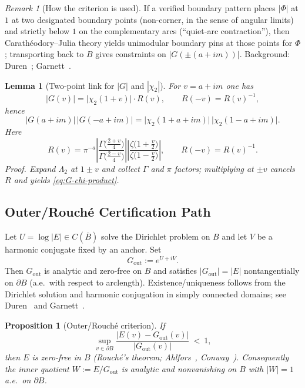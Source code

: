 \documentclass[11pt]{article}
\numberwithin{equation}{section}
\newtheorem{lemma}[theorem]{Lemma}
\newtheorem{proposition}[theorem]{Proposition}
\theoremstyle{remark}
\newtheorem{remark}[theorem]{Remark}
\newcommand{\LamTwo}{\Lambda_2}
\newcommand{\Gout}{G_{\mathrm{out}}}
\begin{document}
\begin{remark}[How the criterion is used]
If a verified boundary pattern places $|\Phi|$ at $1$ at two designated boundary points (non-corner, in the sense of angular limits) and strictly below $1$ on the complementary arcs (``quiet-arc contraction''), then Carath\'eodory--Julia theory yields unimodular boundary pins at those points for $\Phi$; transporting back to $B$ gives constraints on $|G(\pm(a+im))|$. Background: Duren~\cite[Chs.~II, IV--V]{DurenHp}; Garnett~\cite[Chs.~II--III]{GarnettBAF}.
\end{remark}

\begin{lemma}[Two-point link for $|G|$ and $|\chi_2|$]\label{lem:G-chi-link}
For $v=a+im$ one has
\begin{equation}\label{eq:G-chi-link}
|G(v)|=\big|\chi_2(1+v)\big|\cdot R(v),\qquad R(-v)=R(v)^{-1},
\end{equation}
hence
\begin{equation}\label{eq:G-chi-product}
|G(a+im)|\,|G(-a+im)|
=\big|\chi_2(1+a+im)\big|\,\big|\chi_2(1-a+im)\big|.
\end{equation}
Here
\[
R(v)=\pi^{-a}\left|\frac{\Gamma\!\Big(\frac{2+v}{4}\Big)}{\Gamma\!\Big(\frac{2-v}{4}\Big)}\right|
\left|\frac{\zeta\!\big(1+\tfrac{v}{2}\big)}{\zeta\!\big(1-\tfrac{v}{2}\big)}\right|,
\qquad R(-v)=R(v)^{-1}.
\]
\emph{Proof.}
Expand $\LamTwo$ at $1\pm v$ and collect $\Gamma$ and $\pi$ factors; multiplying at $\pm v$ cancels $R$ and yields \eqref{eq:G-chi-product}.
\end{lemma}

\subsection{Outer/Rouch\'e Certification Path}\label{subsec:rouche-criterion}

Let $U=\log|E|\in C(\overline B)$ solve the Dirichlet problem on $B$ and let $V$ be a harmonic conjugate fixed by an anchor. Set
\[
\Gout:=e^{U+iV}.
\]
Then $\Gout$ is analytic and zero-free on $B$ and satisfies $|\Gout|=|E|$ nontangentially on $\partial B$ (a.e.\ with respect to arclength). Existence/uniqueness follows from the Dirichlet solution and harmonic conjugation in simply connected domains; see Duren~\cite[§II.5]{DurenHp} and Garnett~\cite[§II.2]{GarnettBAF}.

\begin{proposition}[Outer/Rouch\'e criterion]\label{prop:rouche-criterion}
If
\begin{equation}\label{eq:rouche-ratio}
\sup_{v\in\partial B}\frac{|E(v)-\Gout(v)|}{|\Gout(v)|}\ <\ 1,
\end{equation}
then $E$ is zero-free in $B$ (Rouch\'e's theorem; Ahlfors~\cite[§§5--6]{Ahlfors}, Conway~\cite[Ch.~VI]{Conway}). Consequently the inner quotient $W:=E/\Gout$ is analytic and nonvanishing on $B$ with $|W|=1$ a.e.\ on $\partial B$.
\end{proposition}
\end{document}
